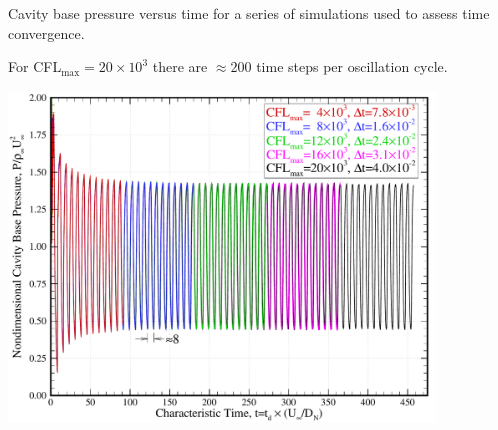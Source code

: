 \documentclass[compress,11pt]{beamer}
\begin{document}
\frame
{
  \vspace{-.5em}
  \scriptsize
  Cavity base pressure versus time for a series of simulations used to assess time convergence.

  For CFL$_{\text{max}}=20\times 10^3$ there are $\approx 200$ time steps per oscillation cycle.
  \vspace{.5em}

  \centerline{\includegraphics[width=0.85\textwidth]{figures/sphere_cavity/LD_2.0/base_pressure_history}}
}
\end{document}
